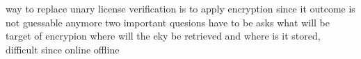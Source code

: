 way to replace unary license verification is to apply encryption since it outcome is not guessable anymore
two important quesions have to be asks
what will be target of encrypion
where will the eky be retrieved and where is it stored, difficult since online offline

